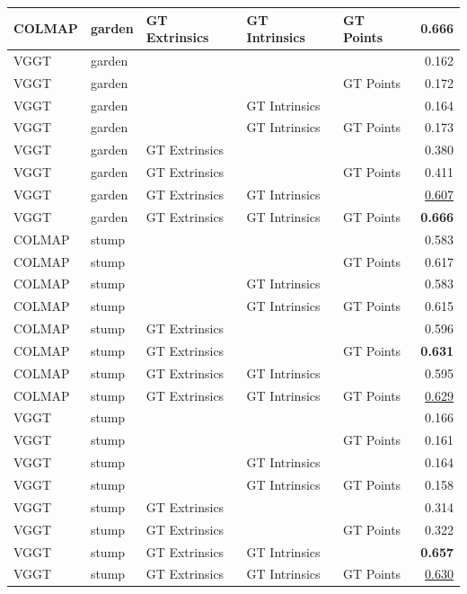 \begin{table}[H]
\begin{tabular}{lllllr}
COLMAP & garden & GT Extrinsics & GT Intrinsics & GT Points & \textbf{0.666} \\
\midrule
VGGT & garden &  &  &  & 0.162 \\
VGGT & garden &  &  & GT Points & 0.172 \\
VGGT & garden &  & GT Intrinsics &  & 0.164 \\
VGGT & garden &  & GT Intrinsics & GT Points & 0.173 \\
VGGT & garden & GT Extrinsics &  &  & 0.380 \\
VGGT & garden & GT Extrinsics &  & GT Points & 0.411 \\
VGGT & garden & GT Extrinsics & GT Intrinsics &  & \underline{0.607} \\
VGGT & garden & GT Extrinsics & GT Intrinsics & GT Points & \textbf{0.666} \\
\midrule
COLMAP & stump &  &  &  & 0.583 \\
COLMAP & stump &  &  & GT Points & 0.617 \\
COLMAP & stump &  & GT Intrinsics &  & 0.583 \\
COLMAP & stump &  & GT Intrinsics & GT Points & 0.615 \\
COLMAP & stump & GT Extrinsics &  &  & 0.596 \\
COLMAP & stump & GT Extrinsics &  & GT Points & \textbf{0.631} \\
COLMAP & stump & GT Extrinsics & GT Intrinsics &  & 0.595 \\
COLMAP & stump & GT Extrinsics & GT Intrinsics & GT Points & \underline{0.629} \\
\midrule
VGGT & stump &  &  &  & 0.166 \\
VGGT & stump &  &  & GT Points & 0.161 \\
VGGT & stump &  & GT Intrinsics &  & 0.164 \\
VGGT & stump &  & GT Intrinsics & GT Points & 0.158 \\
VGGT & stump & GT Extrinsics &  &  & 0.314 \\
VGGT & stump & GT Extrinsics &  & GT Points & 0.322 \\
VGGT & stump & GT Extrinsics & GT Intrinsics &  & \textbf{0.657} \\
VGGT & stump & GT Extrinsics & GT Intrinsics & GT Points & \underline{0.630} \\
\bottomrule
\end{tabular}
\end{table}